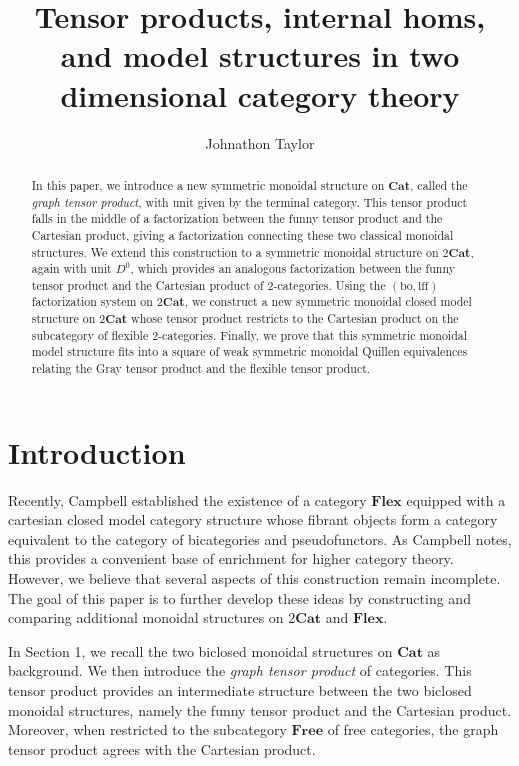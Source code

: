 \documentclass{tac}
\title{Tensor products, internal homs, and model structures in two dimensional category theory}
\author{Johnathon Taylor}
\begin{document}
\maketitle

\begin{abstract}
In this paper, we introduce a new symmetric monoidal structure on
$\mathbf{Cat}$, called the \emph{graph tensor product}, with unit
given by the terminal category. This tensor product falls in the middle of a factorization between the funny tensor product
and the Cartesian product, giving a factorization connecting these two
classical monoidal structures. We extend this construction to a symmetric
monoidal structure on $2\mathbf{Cat}$, again with unit $D^0$, which
provides an analogous factorization between the funny tensor product and
the Cartesian product of $2$-categories. Using the
$(\mathrm{bo},\mathrm{lff})$ factorization system on $2\mathbf{Cat}$, we
construct a new symmetric monoidal closed model structure on
$2\mathbf{Cat}$ whose tensor product restricts to the Cartesian product
on the subcategory of flexible $2$-categories. Finally, we prove that
this symmetric monoidal model structure fits into a square of weak
symmetric monoidal Quillen equivalences relating the Gray tensor product and
the flexible tensor product.
\end{abstract}




\tableofcontents

\section{Introduction}
Recently, Campbell \cite{Campbell2026} established the existence of a
category $\mathbf{Flex}$ equipped with a cartesian closed model category
structure whose fibrant objects form a category equivalent to the
category of bicategories and pseudofunctors. As Campbell notes, this
provides a convenient base of enrichment for higher category theory.
However, we believe that several aspects of this construction remain
incomplete. The goal of this paper is to further develop these ideas by
constructing and comparing additional monoidal structures on
$2\mathbf{Cat}$ and $\mathbf{Flex}$.

In Section 1, we recall the two biclosed monoidal structures on
$\mathbf{Cat}$ as background. We then introduce the
\emph{graph tensor product} of categories. This tensor product provides an
intermediate structure between the two biclosed monoidal structures,
namely the funny tensor product and the Cartesian product. Moreover, when
restricted to the subcategory $\mathbf{Free}$ of free categories, the
graph tensor product agrees with the Cartesian product.
\end{document}
